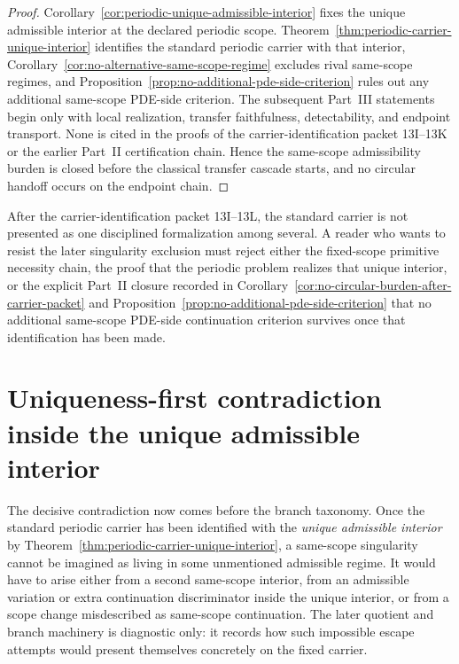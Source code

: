 \begin{proof}
Corollary~\ref{cor:periodic-unique-admissible-interior} fixes the unique admissible interior at the declared periodic scope. Theorem~\ref{thm:periodic-carrier-unique-interior} identifies the standard periodic carrier with that interior, Corollary~\ref{cor:no-alternative-same-scope-regime} excludes rival same-scope regimes, and Proposition~\ref{prop:no-additional-pde-side-criterion} rules out any additional same-scope PDE-side criterion. The subsequent Part~III statements begin only with local realization, transfer faithfulness, detectability, and endpoint transport. None is cited in the proofs of the carrier-identification packet 13I--13K or the earlier Part~II certification chain. Hence the same-scope admissibility burden is closed before the classical transfer cascade starts, and no circular handoff occurs on the endpoint chain.
\end{proof}

\begin{remark}
After the carrier-identification packet 13I--13L, the standard carrier is not presented as one
disciplined formalization among several. A reader who wants to resist the later singularity
exclusion must reject either the fixed-scope primitive necessity chain, the proof that the
periodic problem realizes that unique interior, or the explicit Part~II closure recorded in Corollary~\ref{cor:no-circular-burden-after-carrier-packet}
and Proposition~\ref{prop:no-additional-pde-side-criterion} that no additional same-scope PDE-side continuation criterion survives once that identification has
been made.
\end{remark}


\section{Uniqueness-first contradiction inside the unique admissible interior}\label{sec:uniqueness-first-endgame}
The decisive contradiction now comes before the branch taxonomy. Once the standard periodic carrier has been identified with the \emph{unique admissible interior} by Theorem~\ref{thm:periodic-carrier-unique-interior}, a same-scope singularity cannot be imagined as living in some unmentioned admissible regime. It would have to arise either from a second same-scope interior, from an admissible variation or extra continuation discriminator inside the unique interior, or from a scope change misdescribed as same-scope continuation. The later quotient and branch machinery is diagnostic only: it records how such impossible escape attempts would present themselves concretely on the fixed carrier.

